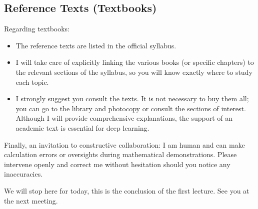     \subsection{Reference Texts (Textbooks)}
    
    Regarding textbooks:
    \begin{itemize}
        \item The reference texts are listed in the official syllabus.
        \item I will take care of explicitly linking the various books (or specific chapters) to the relevant sections of the syllabus, so you will know exactly where to study each topic.
        \item I strongly suggest you consult the texts. It is not necessary to buy them all; you can go to the library and photocopy or consult the sections of interest. Although I will provide comprehensive explanations, the support of an academic text is essential for deep learning.
    \end{itemize}
    
    Finally, an invitation to constructive collaboration: I am human and can make calculation errors or oversights during mathematical demonstrations. Please intervene openly and correct me without hesitation should you notice any inaccuracies.
    
    We will stop here for today, this is the conclusion of the first lecture. See you at the next meeting.